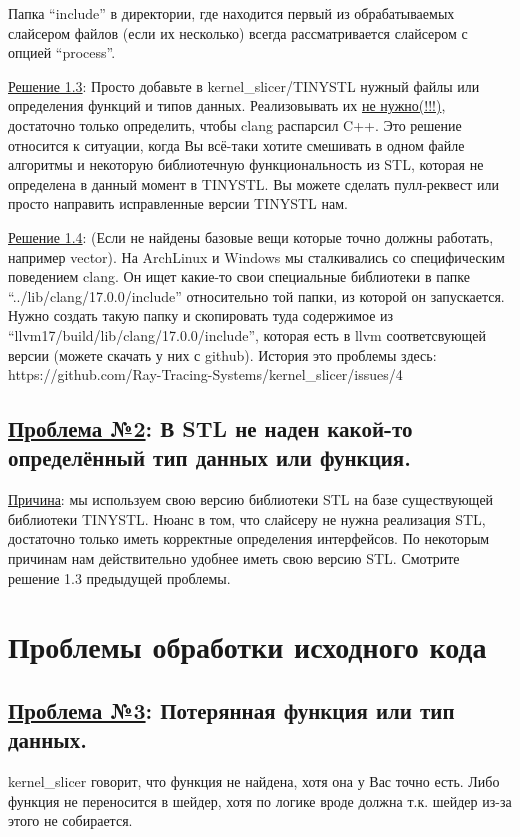 \documentclass[11pt,fleqn,english,russian]{report} %
\begin{document}
\begin{remark}
Папка ``include'' в директории, где находится первый из обрабатываемых слайсером файлов (если их несколько) всегда рассматривается слайсером с опцией ``process''.
\end{remark}

\vspace*{5px}
\noindent\underline{Решение 1.3}: Просто добавьте в kernel\_slicer/TINYSTL нужный файлы или определения функций и типов данных. Реализовывать их \underline{не нужно(!!!)}, достаточно только определить, чтобы clang распарсил C++. Это решение относится к ситуации, когда Вы всё-таки хотите смешивать в одном файле алгоритмы и некоторую библиотечную функциональность из STL, которая не определена в данный момент в TINYSTL. Вы можете сделать пулл-реквест или просто направить исправленные версии TINYSTL нам.

\vspace*{5px}
\noindent\underline{Решение 1.4}: (Если не найдены базовые вещи которые точно должны работать, например vector). На ArchLinux и Windows мы сталкивались со специфическим поведением clang. Он ищет какие-то свои специальные библиотеки в папке ``../lib/clang/17.0.0/include'' относительно той папки, из которой он запускается. Нужно создать такую папку и скопировать туда содержимое из ``llvm17/build/lib/clang/17.0.0/include'', которая есть в llvm соответсвующей версии (можете скачать у них с github). История это проблемы здесь: https://github.com/Ray-Tracing-Systems/kernel\_slicer/issues/4

\subsection{\underline{Проблема №2}: В STL не наден какой-то определённый тип данных или функция.}

\noindent\underline{Причина}: мы используем свою версию библиотеки STL на базе существующей библиотеки TINYSTL. Нюанс в том, что слайсеру не нужна реализация STL, достаточно только иметь корректные определения интерфейсов. По некоторым причинам нам действительно удобнее иметь свою версию STL. Смотрите решение 1.3 предыдущей проблемы.

\section{Проблемы обработки исходного кода}

\subsection{\underline{Проблема №3}: Потерянная функция или тип данных.} kernel\_slicer говорит, что функция не найдена, хотя она у Вас точно есть. Либо функция не переносится в шейдер, хотя по логике вроде должна т.к. шейдер из-за этого не собирается.
\end{document}
